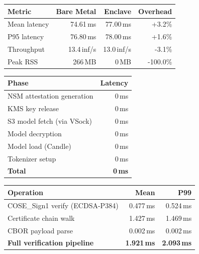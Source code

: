 \begin{tabular}{lrrr}
\hline
\textbf{Metric} & \textbf{Bare Metal} & \textbf{Enclave} & \textbf{Overhead} \\
\hline
Mean latency     & 74.61\,ms  & 77.00\,ms  & +3.2\% \\
P95 latency      & 76.80\,ms  & 78.00\,ms  & +1.6\% \\
Throughput       & 13.4\,inf/s & 13.0\,inf/s & -3.1\% \\
Peak RSS         & 266\,MB    & 0\,MB & -100.0\% \\
\hline
\end{tabular}

\begin{tabular}{lr}
\hline
\textbf{Phase} & \textbf{Latency} \\
\hline
NSM attestation generation & 0\,ms \\
KMS key release            & 0\,ms \\
S3 model fetch (via VSock) & 0\,ms \\
Model decryption           & 0\,ms \\
Model load (Candle)        & 0\,ms \\
Tokenizer setup            & 0\,ms \\
\hline
\textbf{Total}             & \textbf{0\,ms} \\
\hline
\end{tabular}


\begin{tabular}{lrr}
\hline
\textbf{Operation} & \textbf{Mean} & \textbf{P99} \\
\hline
COSE\_Sign1 verify (ECDSA-P384) & 0.477\,ms & 0.524\,ms \\
Certificate chain walk & 1.427\,ms & 1.469\,ms \\
CBOR payload parse & 0.002\,ms & 0.002\,ms \\
\textbf{Full verification pipeline} & \textbf{1.921\,ms} & \textbf{2.093\,ms} \\
\hline
\end{tabular}

